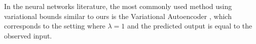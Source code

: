 \documentclass[11pt,letterpaper]{article}
\begin{document}
In the neural networks literature, the most commonly used method using variational bounds similar to ours is the Variational Autoencoder \citep{kingma-auto-encoding-2014}, which corresponds to the setting where $\lambda=1$ and the predicted output is equal to the observed input.



%
%
%
%
%
\end{document}

